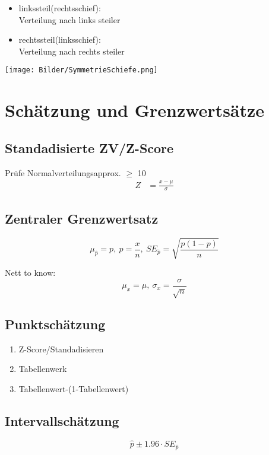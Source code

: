 \documentclass[10pt,a4paper,landscape]{article}
\begin{document}
\begin{multicols}{4}
\begin{itemize}
\item linkssteil(rechtsschief): \\
Verteilung nach links steiler 

\item rechtssteil(linksschief): \\
Verteilung nach rechts steiler
\end{itemize}
\begin{center}
\texttt{[image: Bilder/SymmetrieSchiefe.png]}
\end{center}


\section{Schätzung und Grenzwertsätze}

\subsection{Standadisierte ZV/Z-Score}
Prüfe Normalverteilungsapprox. $\geq$ 10
\begin{align*}
Z &= \frac{x - \mu}{\sigma} 
\end{align*}


\subsection{Zentraler Grenzwertsatz}
\[
\mu_{\hat{p}}=p, ~\hat{p}=\frac{x}{n}, ~SE_{\hat{p}}=\sqrt{\frac{p(1-p)}{n}}
\]

Nett to know:
\[
\mu_x = \mu, ~ \sigma_x = \frac{\sigma}{\sqrt{n}}
\]

\subsection{Punktschätzung}
\begin{enumerate}
\item Z-Score/Standadisieren
\item Tabellenwerk
\item Tabellenwert-(1-Tabellenwert)
\end{enumerate}

\subsection{Intervallschätzung}
\[
\hat{p} \pm 1.96 \cdot SE_{\hat{p}}
\]


\end{multicols}
\end{document}
